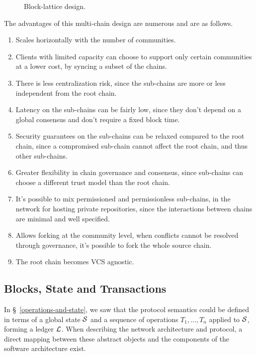 \begin{figure}[htp]
    
    \caption{Block-lattice design.}
\end{figure}

\bigskip

The advantages of this multi-chain design are numerous and are as follows.

\begin{enumerate}
    \item Scales horizontally with the number of communities.
    \item Clients with limited capacity can choose to support only certain
        communities at a lower cost, by syncing a subset of the chains.
    \item There is less centralization risk, since the sub-chains are more or
        less independent from the root chain.
    \item Latency on the sub-chains can be fairly low, since they don’t depend
        on a global consensus and don’t require a fixed block time.
    \item Security guarantees on the sub-chains can be relaxed compared to the
        root chain, since a compromised sub-chain cannot affect the root chain,
        and thus other sub-chains.
    \item Greater flexibility in chain governance and consensus, since
        sub-chains can choose a different trust model than the root chain.
    \item It's possible to mix permissioned and permissionless sub-chains,
        in the network \eg for hosting private repositories, since the
        interactions between chains are minimal and well specified.
    \item Allows forking at the community level, \eg when conflicts cannot be
        resolved through governance, it's possible to fork the whole source
        chain.
    \item The root chain becomes VCS agnostic.
\end{enumerate}

\subsection{Blocks, State and Transactions}

In \S~\ref{operations-and-state}, we saw that the protocol semantics could
be defined in terms of a global state $\mathcal{S}$ and a sequence of operations
$T_1,\dots,T_n$ applied to $\mathcal{S}$, forming a ledger $\mathcal{L}$. When
describing the network architecture and protocol, a direct mapping between
these abstract objects and the components of the software architecture exist.

